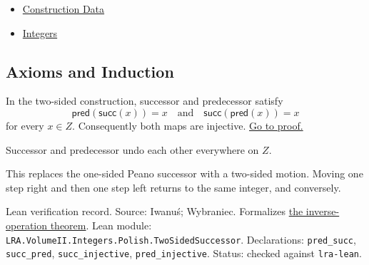 \begin{dependencies}
\begin{itemize}
  \item \hyperref[def:number-system-construction-data]{Construction Data}
  \item \hyperref[def:integers]{Integers}
\end{itemize}
\end{dependencies}

\subsection*{Axioms and Induction}

\begin{theorem}
\label{thm:two-sided-successor-predecessor-inverses}
In the two-sided construction, successor and predecessor satisfy
\[
\mathsf{pred}(\mathsf{succ}(x))=x
\quad\text{and}\quad
\mathsf{succ}(\mathsf{pred}(x))=x
\]
for every \(x\in Z\). Consequently both maps are injective.
\hyperref[prf:two-sided-successor-predecessor-inverses]{Go to proof.}
\end{theorem}

\begin{remark*}
Successor and predecessor undo each other everywhere on \(Z\).
\end{remark*}

\begin{remark*}[Interpretation]
This replaces the one-sided Peano successor with a two-sided motion. Moving one
step right and then one step left returns to the same integer, and conversely.
\end{remark*}

\begin{remark*}[Exposition]
Lean verification record. Source: Iwanu{\'s}; Wybraniec. Formalizes
\hyperref[thm:two-sided-successor-predecessor-inverses]{the inverse-operation
theorem}. Lean module:
\texttt{LRA.VolumeII.Integers.Polish.TwoSidedSuccessor}. Declarations:
\texttt{pred\_succ}, \texttt{succ\_pred}, \texttt{succ\_injective},
\texttt{pred\_injective}. Status: checked against \texttt{lra-lean}.
\end{remark*}

